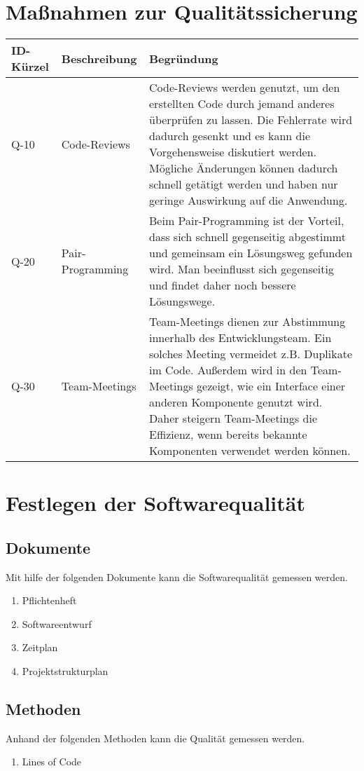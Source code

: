 \section{Maßnahmen zur Qualitätssicherung}
\begin{tabularx}{\textwidth}{|l|X|X|}
    \toprule
    \textbf{ID-Kürzel} & \textbf{Beschreibung} & \textbf{Begründung}\\
    \midrule
    \endhead
    \hline
    \caption{Qualitätssicherung}
    
    \endfoot
    
    Q-10 & Code-Reviews & Code-Reviews werden genutzt, um den erstellten Code durch jemand anderes überprüfen zu lassen. Die Fehlerrate wird dadurch gesenkt und es kann die Vorgehensweise diskutiert werden. Mögliche Änderungen können dadurch schnell getätigt werden und haben nur geringe Auswirkung auf die Anwendung.  \\ \hline
    Q-20 & Pair-Programming & Beim Pair-Programming ist der Vorteil, dass sich schnell gegenseitig abgestimmt und gemeinsam ein Lösungsweg  gefunden wird. Man beeinflusst sich gegenseitig und findet daher noch bessere Lösungswege.\\ \hline
    Q-30 & Team-Meetings & Team-Meetings dienen zur Abstimmung innerhalb des Entwicklungsteam. Ein solches Meeting vermeidet z.B. Duplikate im Code. Außerdem wird in den Team-Meetings gezeigt, wie ein Interface einer anderen Komponente genutzt wird. Daher steigern Team-Meetings die Effizienz, wenn bereits bekannte Komponenten verwendet werden können.\\
	
 
  
\end{tabularx}

\section{Festlegen der Softwarequalität}

\subsection{Dokumente}
Mit hilfe der folgenden Dokumente kann die Softwarequalität gemessen werden.
\begin{enumerate}
\item Pflichtenheft
\item Softwareentwurf
\item Zeitplan
\item Projektstrukturplan

\end{enumerate}

\subsection{Methoden}
Anhand der folgenden Methoden kann die Qualität gemessen werden.
\begin{enumerate}
\item Lines of Code
\end{enumerate}




